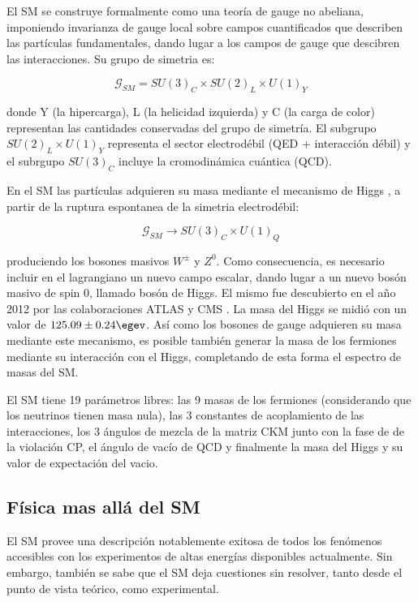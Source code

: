 El SM se construye formalmente como una teoría de gauge no abeliana, imponiendo invarianza de gauge local sobre campos cuantificados que describen las partículas fundamentales, dando lugar a los campos de gauge que descibren las interacciones. Su grupo de simetria es:

\begin{equation}
\mathcal{G}_{SM}=SU(3)_{C}\times SU(2)_{L}\times U(1)_{Y}
\end{equation}


donde Y (la hipercarga), L (la helicidad izquierda) y C (la carga de color) representan las cantidades conservadas del grupo de simetría. El subgrupo $SU(2)_{L}\times U(1)_{Y}$ representa el sector electrodébil (QED + interacción débil) y el subrgupo $SU(3)_{C}$ incluye la cromodinámica cuántica (QCD).


En el SM las partículas adquieren su masa mediante el mecanismo de Higgs \cite{PhysRevLett.13.508}, a partir de la ruptura espontanea de la simetria electrodébil:

\begin{equation}
\mathcal{G}_{SM}\rightarrow SU(3)_{C}\times U(1)_{Q}
\end{equation}

produciendo los bosones masivos $W^{\pm}$ y $Z^{0}$. Como consecuencia, es necesario incluir en el lagrangiano un nuevo campo escalar, dando lugar a un nuevo bosón masivo de spin 0, llamado bosón de Higgs. El mismo fue descubierto en el año 2012 por las colaboraciones ATLAS y CMS \cite{Aad:2012tfa, Chatrchyan:2012xdj}. La masa del Higgs se midió con un valor de $125.09 \pm 0.24 \egev$. Así como los bosones de gauge adquieren su masa mediante este mecanismo, es posible también generar la masa de los fermiones mediante su interacción con el Higgs, completando de esta forma el espectro de masas del SM.

El SM tiene 19 parámetros libres: las 9 masas de los fermiones (considerando que los neutrinos tienen masa nula), las 3 constantes de acoplamiento de las interacciones, los 3 ángulos de mezcla de la matriz CKM junto con la fase de de la violación CP, el ángulo de vacío de QCD y finalmente la masa del Higgs y su valor de expectación del vacio.


\subsection{Física mas allá del SM}

El SM provee una descripción notablemente exitosa de todos los fenómenos accesibles con los experimentos de altas energías disponibles actualmente. Sin embargo, también se sabe que el SM deja cuestiones sin resolver, tanto desde el punto de vista teórico, como experimental.

